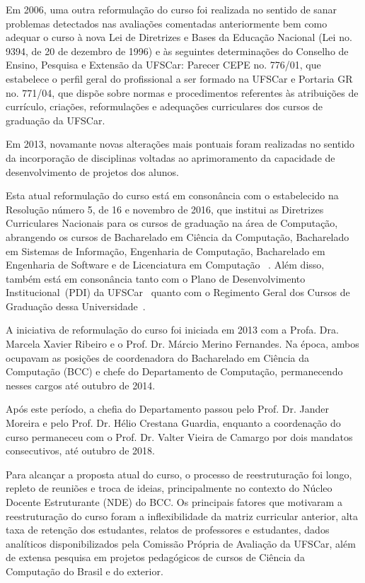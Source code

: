 Em 2006, uma outra reformulação do curso foi realizada no sentido de  sanar problemas detectados nas avaliações comentadas anteriormente bem como adequar o curso à nova
Lei de Diretrizes e Bases da Educação Nacional (Lei no. 9394, de 20 de dezembro de 1996) e às
seguintes determinações do Conselho de Ensino, Pesquisa e Extensão da UFSCar: Parecer CEPE
no. 776/01, que estabelece o perfil geral do profissional a ser formado na UFSCar e Portaria GR no.
771/04, que dispõe sobre normas e procedimentos referentes às atribuições de currículo, criações,
reformulações e adequações curriculares dos cursos de graduação da UFSCar.

Em 2013, novamante novas alterações mais pontuais foram realizadas no sentido da incorporação de disciplinas voltadas ao aprimoramento da capacidade de desenvolvimento de projetos dos alunos. 

Esta atual reformulação do curso está em consonância com o estabelecido na Resolução número 5, de 16 e novembro de 2016, que institui as Diretrizes Curriculares Nacionais para os cursos de graduação na área de Computação, abrangendo os cursos de Bacharelado em Ciência da Computação, Bacharelado em Sistemas de Informação, Engenharia de Computação, Bacharelado em Engenharia de Software e de Licenciatura em Computação ~\cite{DCN-BCC}. Além disso, também está em consonância tanto com o Plano de Desenvolvimento Institucional~(PDI) da UFSCar~\cite{PDI-UFSCar} quanto com o Regimento Geral dos Cursos de Graduação dessa Universidade~\cite{Regimento-Geral-CursosGraduacao-UFSCar}.

A iniciativa de reformulação do curso foi iniciada em 2013 com a Profa. Dra. Marcela Xavier Ribeiro e o Prof. Dr. Márcio Merino Fernandes. Na época, ambos ocupavam as posições de coordenadora do Bacharelado em Ciência da Computação (BCC) e chefe do Departamento de Computação, permanecendo nesses cargos até outubro de 2014.

Após este período, a chefia do Departamento passou pelo Prof. Dr. Jander Moreira e pelo Prof. Dr. Hélio Crestana Guardia, enquanto a coordenação do curso permaneceu com o Prof. Dr. Valter Vieira de Camargo por dois mandatos consecutivos, até outubro de 2018.

Para alcançar a proposta atual do curso, o processo de reestruturação foi longo, repleto de reuniões e troca de ideias, principalmente no contexto do Núcleo Docente Estruturante (NDE) do BCC. Os principais fatores que motivaram a reestruturação do curso foram a inflexibilidade da matriz curricular anterior, alta taxa de retenção dos estudantes, relatos de professores e estudantes, dados analíticos disponibilizados pela Comissão Própria de Avaliação da UFSCar, além de extensa pesquisa em projetos pedagógicos de cursos de Ciência da Computação do Brasil e do exterior. 



